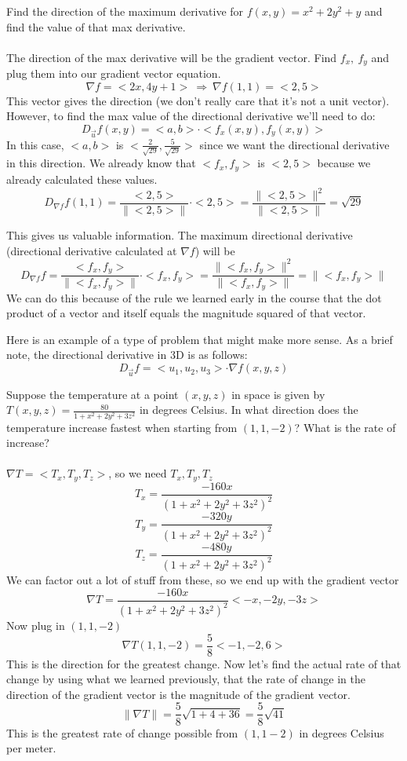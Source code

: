 \documentclass[12 pt]{article}
\begin{document}
        \begin{exmp*}
            Find the direction of the maximum derivative for $f(x,y)=x^2+2y^2+y$ and find the value of that max derivative.\\\\
            The direction of the max derivative will be the gradient vector. Find $f_x,\ f_y$ and plug them into our gradient vector equation.
            $$\nabla f=<2x,4y+1>\ \Rightarrow\ \nabla f(1,1)=<2,5>$$
            This vector gives the direction (we don't really care that it's not a unit vector). However, to find the max value of the directional derivative we'll need to do:
            $$D_{\vec{u}}f(x,y)=<a,b>\cdot<f_x(x,y),f_y(x,y)>$$
            In this case, $<a,b>$ is $<\frac{2}{\sqrt{29}},\frac{5}{\sqrt{29}}>$ since we want the directional derivative in this direction. We already know that $<f_x,f_y>$ is $<2,5>$ because we already calculated these values.
            $$D_{\nabla f}f(1,1)=\frac{<2,5>}{\parallel <2,5>\parallel}\cdot<2,5>=\frac{\parallel<2,5>\parallel^2}{\parallel<2,5>\parallel}=\sqrt{29}$$
        \end{exmp*}
        This gives us valuable information. The maximum directional derivative (directional derivative calculated at $\nabla f$) will be
        $$D_{\nabla f}f=\frac{<f_x,f_y>}{\parallel <f_x,f_y>\parallel}\cdot<f_x,f_y>=\frac{\parallel<f_x,f_y>\parallel^2}{\parallel<f_x,f_y>\parallel}=\parallel<f_x,f_y>\parallel$$
        We can do this because of the rule we learned early in the course that the dot product of a vector and itself equals the magnitude squared of that vector.

        Here is an example of a type of problem that might make more sense. As a brief note, the directional derivative in 3D is as follows:
        $$D_{\vec{u}}f=<u_1,u_2,u_3>\cdot\nabla f(x,y,z)$$
        \begin{exmp*}
            Suppose the temperature at a point $(x,y,z)$ in space is given by $T(x,y,z)=\frac{80}{1+x^2+2y^2+3z^2}$ in degrees Celsius. In what direction does the temperature increase fastest when starting from $(1,1,-2)$? What is the rate of increase?\\\\
            $\nabla T=<T_x,T_y,T_z>$, so we need $T_x,T_y,T_z$
            $$T_x=\frac{-160x}{(1+x^2+2y^2+3z^2)^2}$$
            $$T_y=\frac{-320y}{(1+x^2+2y^2+3z^2)^2}$$
            $$T_z=\frac{-480y}{(1+x^2+2y^2+3z^2)^2}$$
            We can factor out a lot of stuff from these, so we end up with the gradient vector
            $$\nabla T=\frac{-160x}{(1+x^2+2y^2+3z^2)^2}<-x,-2y,-3z>$$
            Now plug in $(1,1,-2)$
            $$\nabla T(1,1,-2)=\frac{5}{8}<-1,-2,6>$$
            This is the direction for the greatest change. Now let's find the actual rate of that change by using what we learned previously, that the rate of change in the direction of the gradient vector is the magnitude of the gradient vector.
            $$\parallel \nabla T \parallel=\frac{5}{8}\sqrt{1+4+36}=\frac{5}{8}\sqrt{41}$$
            This is the greatest rate of change possible from $(1,1-2)$ in degrees Celsius per meter.
        \end{exmp*}
\end{document}
